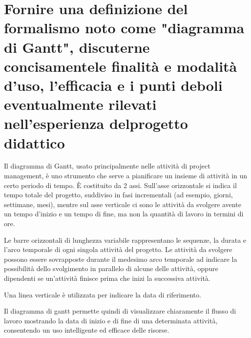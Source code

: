 \section{Fornire una definizione del formalismo noto come "diagramma di Gantt", discuterne concisamentele finalità e modalità d'uso, l'efficacia e i punti deboli eventualmente rilevati nell'esperienza delprogetto didattico}
Il diagramma di Gantt, usato principalmente nelle attività di project management, è uno strumento che serve a pianificare un insieme di attività in un certo periodo di tempo. È costituito da 2 assi. Sull'asse orizzontale si indica il tempo totale del progetto, suddiviso in fasi incrementali (ad esempio, giorni, settimane, mesi), mentre sul asse verticale ci sono le attività da svolgere avente un tempo d’inizio e un tempo di fine, ma non la quantità di lavoro in termini di ore. 

Le barre orizzontali di lunghezza variabile rappresentano le sequenze, la durata e l'arco temporale di ogni singola attività del progetto. Le attività da svolgere possono essere  sovrapposte durante il medesimo arco temporale ad indicare la possibilità dello svolgimento in parallelo di alcune delle attività, oppure dipendenti se un’attività finisce prima che inizi la successiva attività.

Una linea verticale è utilizzata per indicare la data di riferimento. 

Il diagramma di gantt permette quindi di visualizzare chiaramente il flusso di lavoro mostrando la data di inizio e di fine di una determinata attività, consentendo un uso intelligente ed efficace delle risorse.
